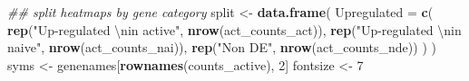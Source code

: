 \documentclass[9pt,a4paper,]{extarticle}
\newenvironment{Shaded}{\begin{snugshade}}{\end{snugshade}}
\newcommand{\CharTok}[1]{\textcolor[rgb]{0.31,0.60,0.02}{#1}}
\newcommand{\CommentTok}[1]{\textcolor[rgb]{0.56,0.35,0.01}{\textit{#1}}}
\newcommand{\DataTypeTok}[1]{\textcolor[rgb]{0.13,0.29,0.53}{#1}}
\newcommand{\DecValTok}[1]{\textcolor[rgb]{0.00,0.00,0.81}{#1}}
\newcommand{\KeywordTok}[1]{\textcolor[rgb]{0.13,0.29,0.53}{\textbf{#1}}}
\newcommand{\NormalTok}[1]{#1}
\newcommand{\StringTok}[1]{\textcolor[rgb]{0.31,0.60,0.02}{#1}}
\begin{document}
\begin{Shaded}
\begin{Highlighting}[]
\CommentTok{## split heatmaps by gene category}
\NormalTok{split <-}\StringTok{ }\KeywordTok{data.frame}\NormalTok{(}
  \DataTypeTok{Upregulated =} \KeywordTok{c}\NormalTok{(}
    \KeywordTok{rep}\NormalTok{(}\StringTok{"Up-regulated }\CharTok{\textbackslash{}n}\StringTok{in active"}\NormalTok{, }\KeywordTok{nrow}\NormalTok{(act_counts_act)),}
    \KeywordTok{rep}\NormalTok{(}\StringTok{"Up-regulated }\CharTok{\textbackslash{}n}\StringTok{in naive"}\NormalTok{, }\KeywordTok{nrow}\NormalTok{(act_counts_nai)),}
    \KeywordTok{rep}\NormalTok{(}\StringTok{"Non DE"}\NormalTok{, }\KeywordTok{nrow}\NormalTok{(act_counts_nde))}
\NormalTok{  )}
\NormalTok{)}
\NormalTok{syms <-}\StringTok{ }\NormalTok{genenames[}\KeywordTok{rownames}\NormalTok{(counts_active), }\DecValTok{2}\NormalTok{]}
\NormalTok{fontsize <-}\StringTok{ }\DecValTok{7}


\end{Highlighting}
\end{Shaded}
\end{document}
